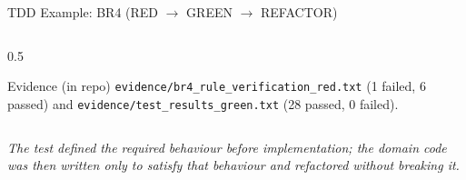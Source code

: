 \documentclass[aspectratio=169,11pt]{beamer}
\newcommand{\code}[1]{\texttt{#1}}
\begin{document}
\begin{frame}{TDD Example: BR4 (RED $\rightarrow$ GREEN $\rightarrow$ REFACTOR)}
\begin{columns}[t]
\begin{column}{0.5\textwidth}
      \begin{block}{Evidence (in repo)}
        \scriptsize \code{evidence/br4\_rule\_verification\_red.txt}
        (1 failed, 6 passed) and \code{evidence/test\_results\_green.txt}
        (28 passed, 0 failed).
      \end{block}
    \end{column}
  \end{columns}
  {\scriptsize\itshape \centering
  The test defined the required behaviour before implementation; the domain
  code was then written only to satisfy that behaviour and refactored without
  breaking it.}
\end{frame}

\end{document}
